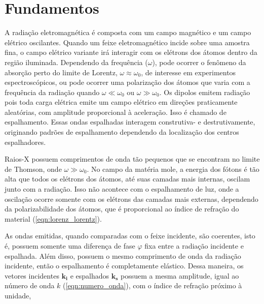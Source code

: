 		\section{Fundamentos} 
		
		
		A radiação eletromagnética é composta com um campo magnético e um campo elétrico oscilantes. Quando um feixe eletromagnético incide sobre uma amostra fina, o campo elétrico variante irá interagir com os elétrons dos átomos dentro da região iluminada. Dependendo da frequência (\(\omega\)), pode ocorrer o fenômeno da absorção perto do limite de Lorentz, \(\omega \approx \omega_0\), de interesse em experimentos espectroscópicos, ou pode ocorrer uma polarização dos átomos que varia com a frequência da radiação quando \(\omega \ll \omega_0\) ou \(\omega \gg \omega_0\). Os dipolos emitem radiação pois toda carga elétrica emite um campo elétrico em direções praticamente aleatórias, com amplitude proporcional à aceleração. Isso é chamado de espalhamento. Essas ondas espalhadas interagem construtiva- e destrutivamente, originando padrões de espalhamento dependendo da localização dos centros espalhadores.\cite{Glatter2018livro}
		
		Raios-X possuem comprimentos de onda tão pequenos que se encontram no limite de Thomson, onde \(\omega \gg \omega_0\). No campo da matéria mole, a energia dos fótons é tão alta que todos os elétrons dos átomos, até suas camadas mais internas, oscilam junto com a radiação. Isso não acontece com o espalhamento de luz, onde a oscilação ocorre somente com os elétrons das camadas mais externas, dependendo da polarizabilidade dos átomos, que é proporcional ao índice de refração do material (\autoref{eqn:lorenz_lorentz}).\cite{Glatter2018livro}
		
		As ondas emitidas, quando comparadas com o feixe incidente, são coerentes, isto é, possuem somente uma diferença de fase \(\varphi\) fixa entre a radiação incidente e espalhada. Além disso, possuem o mesmo comprimento de onda da radiação incidente, então o espalhamento é completamente elástico. Dessa maneira, os vetores incidentes \(\mathbf{k_i}\) e espalhados \(\mathbf{k_s}\) possuem a mesma amplitude, igual ao número de onda \(k\) (\autoref{eqn:numero_onda}), com o índice de refração próximo à unidade, 
		
